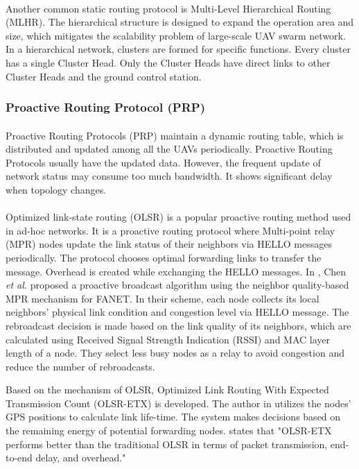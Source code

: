 \documentclass[a4paper,12pt]{report}
\begin{document}
\paragraph{}
Another common static routing protocol is Multi-Level Hierarchical Routing (MLHR). The hierarchical structure is designed to expand the operation area and size, which mitigates the scalability problem of large-scale UAV swarm network\cite{guillen2021comparative}. In a hierarchical network, clusters are formed for specific functions. Every cluster has a single Cluster Head. Only the Cluster Heads have direct links to other Cluster Heads and the ground control station.

\subsubsection{Proactive Routing Protocol (PRP)}
\paragraph{}
Proactive Routing Protocols (PRP) maintain a dynamic routing table, which is distributed and updated among all the UAVs periodically. Proactive Routing Protocols usually have the updated data. However, the frequent update of network status may consume too much bandwidth. It shows significant delay when topology changes\cite{7995044}.

\paragraph{}
Optimized link-state routing (OLSR) is a popular proactive routing method used in ad-hoc networks\cite{8772093}. It is a proactive routing protocol where Multi-point relay (MPR) nodes update the link status of their neighbors via HELLO messages periodically. The protocol chooses optimal forwarding links to transfer the message. Overhead is created while exchanging the HELLO messages. In \cite{5}, Chen {\it et al.} proposed a proactive broadcast algorithm using the neighbor quality-based MPR mechanism for FANET. In their scheme, each node collects its local neighbors' physical link condition and congestion level via HELLO message. The rebroadcast decision is made based on the link quality of its neighbors, which are calculated using Received Signal Strength Indication (RSSI) and MAC layer length of a node. They select less busy nodes as a relay to avoid congestion and reduce the number of rebroadcasts.

Based on the mechanism of OLSR, Optimized Link Routing With Expected Transmission Count (OLSR-ETX) is developed\cite{Xie2018AnEO}. The author in \cite{Xie2018AnEO} utilizes the nodes' GPS positions to calculate link life-time. The system makes decisions based on the remaining energy of potential forwarding nodes. \cite{8772093} states that "OLSR-ETX performs better than the traditional OLSR in terms of packet transmission, end-to-end delay, and overhead."
\end{document}
